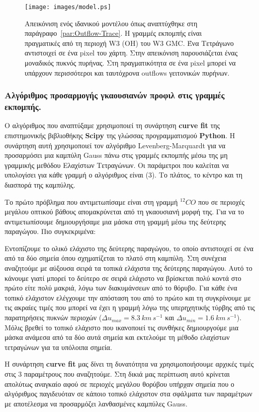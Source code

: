 \documentclass[a4paper,12pt]{memoir}
\begin{document}
\begin{figure}[h!]
	\centering
	\texttt{[image: images/model.ps]}
	\caption{Απεικόνιση ενός ιδανικού μοντέλου όπως αναπτύχθηκε στη παράγραφο~\ref{par:Outflow-Trace}. Η γραμμές εκπομπής είναι πραγματικές από τη περιοχή W3 (OH) του W3 GMC. Ένα Τετράγωνο αντιστοιχεί σε ένα pixel του χάρτη. Στην απεικόνιση παρουσιάζεται ένας μοναδικός πυκνός πυρήνας. Στη πραγματικότητα σε ένα pixel μπορεί να υπάρχουν περισσότεροι και ταυτόχρονα outflows γειτονικών πυρήνων.}
\end{figure}


\subsubsection{Αλγόριθμος προσαρμογής γκαουσιανών προφιλ στις γραμμές εκπομπής.}

Ο αλγόριθμος που αναπτύξαμε χρησιμοποιεί τη συνάρτηση \textbf{curve fit} της επιστημονικής βιβλιοθήκης \textbf{Scipy} της γλώσσας προγραμματισμού \textbf{Python}. Η συνάρτηση αυτή χρησιμοποιεί τον αλγόριθμο Levenberg-Marquardt για να προσαρμόσει μια καμπύλη Gauss πάνω στις γραμμές εκπομπής μέσω της μη γραμμικής μεθόδου Ελαχίστων Τετραγώνων. Οι παράμετροι που καλείται να υπολογίσει για κάθε γραμμή ο αλγόριθμος είναι (3). Το πλάτος, το κέντρο και τη διασπορά της καμπύλης.

Το πρώτο πρόβλημα που αντιμετωπίσαμε είναι στη γραμμή $^{12}CO$ που σε περιοχές μεγάλου οπτικού βάθους απομακρύνεται από τη γκαουσιανή μορφή της. Για να το αντιμετωπίσουμε δημιουργήσαμε μια μάσκα στη γραμμή μέσω της δεύτερης παραγώγου. Πιο συγκεκριμένα:

Εντοπίζουμε το ολικό ελάχιστο της δεύτερης παραγώγου, το οποίο αντιστοιχεί σε ένα από τα δύο σημεία όπου σχηματίζεται το πλατό στη καμπύλη. Στη συνέχεια αναζητούμε με αύξουσα σειρά τα τοπικά ελάχιστα της δεύτερης παραγώγου. Αυτό το κάνουμε γιατί μπορεί το δεύτερο σε σειρά ελάχιστο να βρίσκεται πολύ κοντά στο πρώτο είτε πολύ μακριά, λόγω των διακυμάνσεων από το θόρυβο. Για κάθε ένα τοπικό ελάχιστον ελέγχουμε την απόσταση του από το πρώτο και τη συγκρίνουμε με τις ακραίες τιμές που μπορεί να έχει η γραμμή λόγω της υπερηχητικής τύρβης από τις παρατηρήσεις πυκνών περιοχών ($\Delta u _{max}=8.3 \ km\, s^{-1}$ και $\Delta u _{min} =1.6 \ km\, s^{-1}$). Μόλις βρεθεί το τοπικό ελάχιστο που ικανοποιεί τις συνθήκες δημιουργούμε μια μάσκα ανάμεσα από τα δύο αυτά σημεία και εκτελούμε τη μέθοδο ελαχίστων τετραγώνων για τα υπόλοιπα σημεία.

Η συνάρτηση \textbf{curve fit} μας δίνει τη δυνατότητα να χρησιμοποιήσουμε αρχικές τιμές στις 3 παραμέτρους που αναζητούμε. Στη δικιά μας περίπτωση αυτό κρίνεται απολύτως αναγκαίο αφού σε περιοχές μεγάλου θορύβου υπήρχαν σημεία που ο αλγόριθμος παγιδευόταν σε κάποιο τοπικό ελάχιστον στα σφάλματα των παραμέτρων με αποτέλεσμα να προσαρμόζει λανθασμένες καμπύλες Gauss. 
\end{document}
